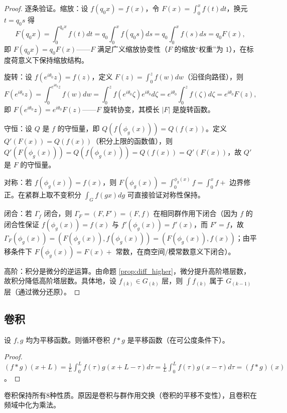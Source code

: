 \begin{proof}
逐条验证。缩放：设 $f(q_0x)=f(x)$，令 $F(x)=\int_0^x f(t)dt$，换元 $t=q_0s$ 得
\[
F(q_0x)=\int_0^{q_0x}f(t)dt=q_0\int_0^x f(q_0s)ds=q_0\int_0^x f(s)ds=q_0F(x),
\]
即 $F(q_0x)=q_0F(x)$——$F$ 满足广义缩放协变性（$F$ 的缩放“权重”为 $1$），在标度荷意义下保持缩放结构。

旋转：设 $f(e^{i\theta_0}z)=f(z)$，定义 $F(z)=\int_0^z f(w)dw$（沿径向路径），则
\[
F(e^{i\theta_0}z)=\int_0^{e^{i\theta_0}z}f(w)dw=\int_0^z f(e^{i\theta_0}\zeta)e^{i\theta_0}d\zeta=e^{i\theta_0}\int_0^z f(\zeta)d\zeta=e^{i\theta_0}F(z),
\]
即 $F(e^{i\theta_0}z)=e^{i\theta_0}F(z)$——$F$ 旋转协变，其模长 $|F|$ 是旋转函数。

守恒：设 $Q$ 是 $f$ 的守恒量，即 $Q(f(\phi_g(x)))=Q(f(x))$。定义 $Q'(F(x))=Q(f(x))$（积分上限的函数值），则 $Q'(F(\phi_g(x)))=Q(f(\phi_g(x)))=Q(f(x))=Q'(F(x))$，故 $Q'$ 是 $F$ 的守恒量。

对称：若 $f(\phi_g(x))=f(x)$，则 $F(\phi_g(x))=\int_0^{\phi_g(x)}f=\int_0^x f+$ 边界修正。在紧群上取不变积分 $\int_G f(gx)dg$ 可直接验证对称性保持。

闭合：若 $\Gamma_f$ 闭合，则 $\Gamma_F=(F,F')=(F,f)$ 在相同群作用下闭合（因为 $f$ 的闭合性保证 $f(\phi_g(x))=f(x)$ 与 $f'(\phi_g(x))=f'(x)$，而 $F' = f$，故 $\Gamma_F(\phi_g(x))=(F(\phi_g(x)),f(\phi_g(x)))=(F(\phi_g(x)),f(x))$；由平移条件下 $F(\phi_g(x))=F(x)+$ 常数，在商空间/模常数意义下闭合）。

高阶：积分是微分的逆运算。由命题 \ref{prop:diff_higher}，微分提升高阶塔层数，故积分降低高阶塔层数。具体地，设 $f_{(k)}\in G_{(k)}$ 层，则 $\int f_{(k)}$ 属于 $G_{(k-1)}$ 层（通过微分还原）。
\end{proof}

\subsection{卷积}

\begin{proposition}[卷积下平移性质的保持]\label{prop:conv_translation}
设 $f, g$ 均为平移函数。则循环卷积 $f * g$ 是平移函数（在可公度条件下）。
\end{proposition}

\begin{proof}
$(f * g)(x+L) = \frac{1}{L}\int_0^L f(\tau) g(x+L-\tau) d\tau = \frac{1}{L}\int_0^L f(\tau) g(x-\tau) d\tau = (f * g)(x)$。
\end{proof}

\begin{proposition}\label{prop:conv_all}
卷积保持所有8种性质。原因是卷积与群作用交换（卷积的平移不变性），且卷积在频域中化为乘法。
\end{proposition}

